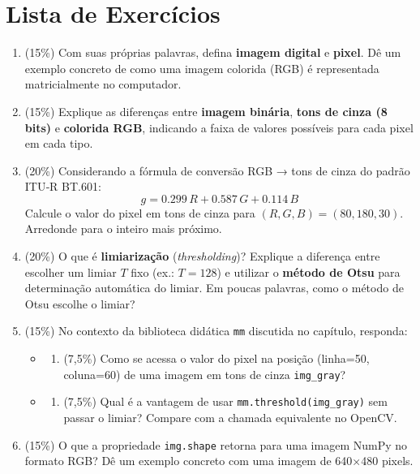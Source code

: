 \documentclass[
  portuguese,
  letterpaper,
  openany,
  oneside,
  12pt,
  a4paper]{book}
\providecommand{\tightlist}{%
  \setlength{\itemsep}{0pt}\setlength{\parskip}{0pt}}
\begin{document}
\section{Lista de Exercícios}\label{lista-de-exercuxedcios}

\begin{enumerate}
\def\labelenumi{\arabic{enumi}.}
\item
  (15\%) Com suas próprias palavras, defina \textbf{imagem digital} e
  \textbf{pixel}. Dê um exemplo concreto de como uma imagem colorida
  (RGB) é representada matricialmente no computador.
\item
  (15\%) Explique as diferenças entre \textbf{imagem binária},
  \textbf{tons de cinza (8 bits)} e \textbf{colorida RGB}, indicando a
  faixa de valores possíveis para cada pixel em cada tipo.
\item
  (20\%) Considerando a fórmula de conversão RGB → tons de cinza do
  padrão ITU‑R BT.601: \[g = 0.299\,R + 0.587\,G + 0.114\,B\] Calcule o
  valor do pixel em tons de cinza para \((R,G,B) = (80, 180, 30)\).
  Arredonde para o inteiro mais próximo.
\item
  (20\%) O que é \textbf{limiarização} (\emph{thresholding})? Explique a
  diferença entre escolher um limiar \(T\) fixo (ex.: \(T=128\)) e
  utilizar o \textbf{método de Otsu} para determinação automática do
  limiar. Em poucas palavras, como o método de Otsu escolhe o limiar?
\item
  (15\%) No contexto da biblioteca didática \texttt{mm} discutida no
  capítulo, responda:

  \begin{itemize}
  \tightlist
  \item
    \begin{enumerate}
    \def\labelenumii{\alph{enumii})}
    \tightlist
    \item
      (7,5\%) Como se acessa o valor do pixel na posição (linha=50,
      coluna=60) de uma imagem em tons de cinza \texttt{img\_gray}?
    \end{enumerate}
  \item
    \begin{enumerate}
    \def\labelenumii{\alph{enumii})}
    \setcounter{enumii}{1}
    \tightlist
    \item
      (7,5\%) Qual é a vantagem de usar \texttt{mm.threshold(img\_gray)}
      sem passar o limiar? Compare com a chamada equivalente no OpenCV.
    \end{enumerate}
  \end{itemize}
\item
  (15\%) O que a propriedade \texttt{img.shape} retorna para uma imagem
  NumPy no formato RGB? Dê um exemplo concreto com uma imagem de 640×480
  pixels.
\end{enumerate}
\end{document}
